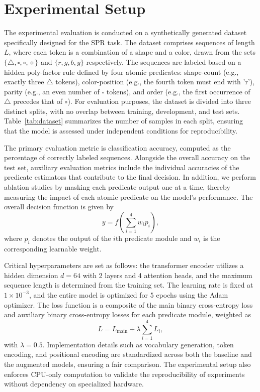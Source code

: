 \documentclass{article}
\begin{document}
\section{Experimental Setup}
The experimental evaluation is conducted on a synthetically generated dataset specifically designed for the SPR task. The dataset comprises sequences of length \(L\), where each token is a combination of a shape and a color, drawn from the sets \(\{\triangle, \square, \circ, \diamond\}\) and \(\{r, g, b, y\}\) respectively. The sequences are labeled based on a hidden poly-factor rule defined by four atomic predicates: shape-count (e.g., exactly three \(\triangle\) tokens), color-position (e.g., the fourth token must end with 'r'), parity (e.g., an even number of \(\square\) tokens), and order (e.g., the first occurrence of \(\triangle\) precedes that of \(\circ\)). For evaluation purposes, the dataset is divided into three distinct splits, with no overlap between training, development, and test sets. Table~\ref{tab:dataset} summarizes the number of samples in each split, ensuring that the model is assessed under independent conditions for reproducibility.

The primary evaluation metric is classification accuracy, computed as the percentage of correctly labeled sequences. Alongside the overall accuracy on the test set, auxiliary evaluation metrics include the individual accuracies of the predicate estimators that contribute to the final decision. In addition, we perform ablation studies by masking each predicate output one at a time, thereby measuring the impact of each atomic predicate on the model's performance. The overall decision function is given by
\[
y = f\left(\sum_{i=1}^{4} w_i p_i\right),
\]
where \(p_i\) denotes the output of the \(i\)th predicate module and \(w_i\) is the corresponding learnable weight.

Critical hyperparameters are set as follows: the transformer encoder utilizes a hidden dimension \(d = 64\) with 2 layers and 4 attention heads, and the maximum sequence length is determined from the training set. The learning rate is fixed at \(1 \times 10^{-3}\), and the entire model is optimized for 5 epochs using the Adam optimizer. The loss function is a composite of the main binary cross-entropy loss and auxiliary binary cross-entropy losses for each predicate module, weighted as
\[
L = L_{\text{main}} + \lambda \sum_{i=1}^{4} L_i,
\]
with \(\lambda = 0.5\). Implementation details such as vocabulary generation, token encoding, and positional encoding are standardized across both the baseline and the augmented models, ensuring a fair comparison. The experimental setup also enforces CPU-only computation to validate the reproducibility of experiments without dependency on specialized hardware.
\end{document}
